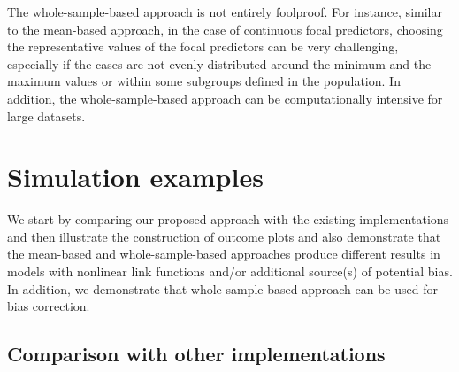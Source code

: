 The whole-sample-based approach is not entirely foolproof. For instance, similar to the mean-based approach, in the case of continuous focal predictors, choosing the representative values of the focal predictors can be very challenging, especially if the cases are not evenly distributed around the minimum and the maximum values or within some subgroups defined in the population. In addition, the whole-sample-based approach can be computationally intensive for large datasets.



\section{Simulation examples}

We start by comparing our proposed approach with the existing implementations and then illustrate the construction of outcome plots and also demonstrate that the mean-based and whole-sample-based approaches produce different results in models with nonlinear link functions and/or additional source(s) of potential bias. In addition, we demonstrate that whole-sample-based approach can be used for bias correction.

\subsection{Comparison with other implementations}

